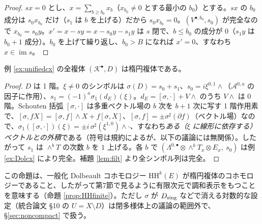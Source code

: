 \begin{proof}
$s x=0$ とし、$x=\sum_{b\ge b_0}x_b$（$x_{b_0}\ne0$ とする最小の $b_0$）とする。$sx$ の $b_0$ 成分は $s_0x_{b_0}$ だけ（$s_1$ は $b$ を上げる）だから $s_0x_{b_0}=0$。$(V^{\bullet,b_0},s_0)$ が完全なので $x_{b_0}=s_0y$。$x'=x-sy=x-s_0y-s_1y$ は $s$ 閉で、$b\le b_0$ の成分が $0$（$s_1y$ は $b_0+1$ 成分）。$b_0$ を上げて繰り返し、$b_0>B$ になれば $x'=0$、すなわち $x\in\operatorname{im}s$。
\end{proof}
\begin{prop}\label{prop:unifiedell}\tP
例 \ref{ex:unifiedcx} の全複体 $(\mathcal K^\bullet,D)$ は楕円複体である。
\end{prop}
\begin{proof}
$D$ は 1 階。$\xi\ne0$ のシンボルは $\sigma(D)=s_0+s_1$、$s_0=i\xi^{0,1}\wedge$（$\mathcal A^{0,a}$ の因子に作用）、$s_1=(-1)^a\sigma_1(d_E)(\xi)$。$d_E=[\sigma,\cdot]+V\wedge$ のうち $V\wedge$ は $0$ 階。Schouten 括弧 $[\sigma,\cdot]$ は多重ベクトル場の $b$ 次を $b+1$ 次に写す 1 階作用素で、$[\sigma,fX]=[\sigma,f]\wedge X+f[\sigma,X]$、$[\sigma,f]=\pm\sigma^\sharp(\partial f)$（ベクトル場）なので、$\sigma_1([\sigma,\cdot])(\xi)=\pm i\,\sigma^\sharp(\xi^{1,0})\wedge\cdot$、すなわち\emph{ある（$\xi$ に線形に依存する）ベクトルとの外積}である（符号は規約によるが、以下の議論には無関係\tQ）。したがって $s_1$ は $\wedge^bT$ の次数 $b$ を $1$ 上げる。各 $b$ で $(\Lambda^{0,\bullet}\otimes\wedge^bT_x\otimes E_x,\ s_0)$ は例 \ref{ex:Dolcx} により完全。補題 \ref{lem:filt} より全シンボル列は完全。
\end{proof}
この命題は、一般化 Dolbeault コホモロジー $\mathrm{HH}^k(E)$ が楕円複体のコホモロジーであること、したがって第7節で見るように有限次元で調和表示をもつことを意味する（命題 \ref{prop:HHfinite}）。ただし $\sigma$ が $D_{\rm sing}$ などで消える対数的な設定（統合論文 §10 の $U=X\setminus D$）は閉多様体上の議論の範囲外で、\S\ref{sec:noncompact} で扱う。

